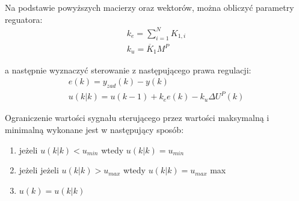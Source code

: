 Na podstawie powyższych macierzy oraz wektorów, można obliczyć parametry reguatora:
\begin{gather}
        k_e = \sum^N_{i=1}K_{1,i}\\
	k_u = \overline{K}_1 M^P
\end{gather}

a następnie wyznaczyć sterowanie z następującego prawa regulacji:
\begin{gather}
	e(k) = y_{zad}(k) - y(k)\\
    	u(k|k) = u(k - 1) + k_e e(k) - k_u \Delta U^P(k)
\end{gather}

Ograniczenie wartości sygnału sterującego przez wartości maksymalną i minimalną wykonane jest w następujący sposób:
\begin{enumerate}
    \item jeżeli $u(k|k) < u_{min}$ wtedy $u(k|k) = u_{min}$
\item jeżeli jeżeli $u(k|k) > u_{max}$ wtedy $u(k|k) = u_{max}$
max
\item $u(k) = u(k|k)$
\end{enumerate}